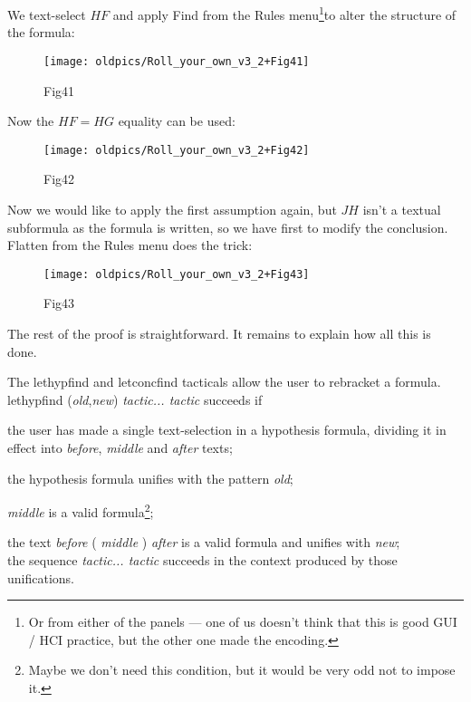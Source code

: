 We text-select $HF$ and apply Find from the Rules menu\footnote{Or from either of the panels --- one of us doesn't think that this is good GUI / HCI practice, but the other one made the encoding.}to alter the structure of the formula:

\begin{figure}[htbp] \begin{center} \texttt{[image: oldpics/Roll\_your\_own\_v3\_2+Fig41]} \caption{Fig41} \end{center} \end{figure}


Now the $HF=HG$ equality can be used:

\begin{figure}[htbp] \begin{center} \texttt{[image: oldpics/Roll\_your\_own\_v3\_2+Fig42]} \caption{Fig42} \end{center} \end{figure}


Now we would like to apply the first assumption again, but $JH$ isn't a textual subformula as the formula is written, so we have first to modify the conclusion. Flatten from the Rules menu does the trick:

\begin{figure}[htbp] \begin{center} \texttt{[image: oldpics/Roll\_your\_own\_v3\_2+Fig43]} \caption{Fig43} \end{center} \end{figure}


The rest of the proof is straightforward. It remains to explain how all this is done.


The lethypfind and letconcfind tacticals allow the user to rebracket a formula. lethypfind (\textit{old},\textit{new}) \textit{tactic... tactic} succeeds if


{\textbullet}\tab the user has made a single text-selection in a hypothesis formula, dividing it in effect into \textit{before}, \textit{middle} and \textit{after} texts;


{\textbullet}\tab the hypothesis formula unifies with the pattern \textit{old};


{\textbullet}\tab \textit{middle} is a valid formula\footnote{Maybe we don't need this condition, but it would be very odd not to impose it.};


{\textbullet}\tab the text \textit{before} ( \textit{middle} ) \textit{after} is a valid formula and unifies with \textit{new};\\
{\textbullet}\tab the sequence \textit{tactic... tactic} succeeds in the context produced by those unifications.


